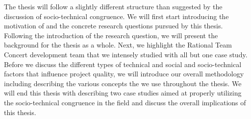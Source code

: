 

The thesis will follow a slightly different structure than suggested by the discussion of socio-technical congruence.
We will first start introducing the motivation of and the concrete research questions pursued by this thesis.
Following the introduction of the research question, we will present the background for the thesis as a whole.
Next, we highlight the Rational Team Concert development team that we intensely studied with all but one case study. 
Before we discuss the different types of technical and social and socio-technical factors that influence project quality, we will introduce our overall methodology including describing the various concepts the we use throughout the thesis.
We will end this thesis with describing two case studies aimed at properly utilizing the socio-technical congruence in the field and discuss the overall implications of this thesis.































